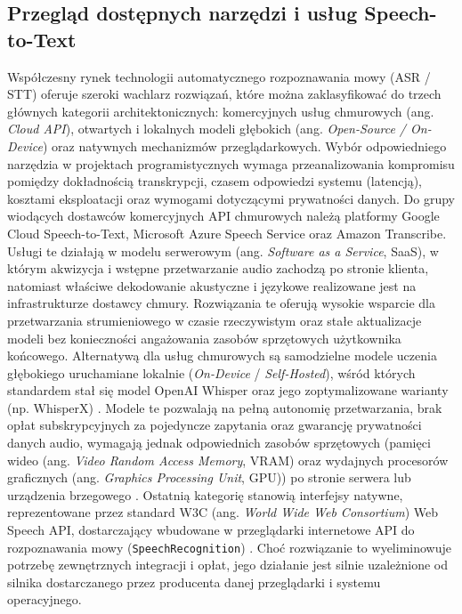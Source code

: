 \subsection{Przegląd dostępnych narzędzi i usług Speech-to-Text}
Współczesny rynek technologii automatycznego rozpoznawania mowy (ASR / STT) oferuje szeroki wachlarz rozwiązań, które można zaklasyfikować do trzech głównych kategorii architektonicznych: komercyjnych usług chmurowych (ang. \textit{Cloud API}), otwartych i lokalnych modeli głębokich (ang. \textit{Open-Source / On-Device}) oraz natywnych mechanizmów przeglądarkowych. Wybór odpowiedniego narzędzia w projektach programistycznych wymaga przeanalizowania kompromisu pomiędzy dokładnością transkrypcji, czasem odpowiedzi systemu (latencją), kosztami eksploatacji oraz wymogami dotyczącymi prywatności danych. Do grupy wiodących dostawców komercyjnych API chmurowych należą platformy Google Cloud Speech-to-Text, Microsoft Azure Speech Service oraz Amazon Transcribe. Usługi te działają w modelu serwerowym (ang. \textit{Software as a Service}, SaaS), w którym akwizycja i wstępne przetwarzanie audio zachodzą po stronie klienta, natomiast właściwe dekodowanie akustyczne i językowe realizowane jest na infrastrukturze dostawcy chmury. Rozwiązania te oferują wysokie wsparcie dla przetwarzania strumieniowego w czasie rzeczywistym oraz stałe aktualizacje modeli bez konieczności angażowania zasobów sprzętowych użytkownika końcowego. Alternatywą dla usług chmurowych są samodzielne modele uczenia głębokiego uruchamiane lokalnie (\textit{On-Device} / \textit{Self-Hosted}), wśród których standardem stał się model OpenAI Whisper oraz jego zoptymalizowane warianty (np. WhisperX) \cite[s.~2--3]{ferraro2023benchmarking}. Modele te pozwalają na pełną autonomię przetwarzania, brak opłat subskrypcyjnych za pojedyncze zapytania oraz gwarancję prywatności danych audio, wymagają jednak odpowiednich zasobów sprzętowych (pamięci wideo (ang. \textit{Video Random Access Memory}, VRAM) oraz wydajnych procesorów graficznych (ang. \textit{Graphics Processing Unit}, GPU)) po stronie serwera lub urządzenia brzegowego \cite[s.~18]{pudo2024optimizing}. Ostatnią kategorię stanowią interfejsy natywne, reprezentowane przez standard W3C (ang. \textit{World Wide Web Consortium}) Web Speech API, dostarczający wbudowane w przeglądarki internetowe API do rozpoznawania mowy (\texttt{SpeechRecognition}) \cite[s.~1]{mdnWebSpeechAPI}. Choć rozwiązanie to wyeliminowuje potrzebę zewnętrznych integracji i opłat, jego działanie jest silnie uzależnione od silnika dostarczanego przez producenta danej przeglądarki i systemu operacyjnego.


